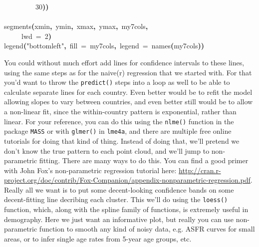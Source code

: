 \documentclass[a4paper]{article}
\newcommand{\hlnumber}[1]{\textcolor[rgb]{0.0823529411764706,0.0784313725490196,0.709803921568627}{#1}}%
\newcommand{\hlfunctioncall}[1]{\textcolor[rgb]{1,0,0}{#1}}%
\newcommand{\hlstring}[1]{\textcolor[rgb]{0.6,0.6,1}{#1}}%
\newcommand{\hlkeyword}[1]{\textcolor[rgb]{0,0,0}{\textbf{#1}}}%
\newcommand{\hlargument}[1]{\textcolor[rgb]{0.694117647058824,0.247058823529412,0.0196078431372549}{#1}}%
\newcommand{\hlsymbol}[1]{\textcolor[rgb]{0,0,0}{#1}}%
\newcommand{\hlprompt}[1]{\textcolor[rgb]{0,0,0}{#1}}%
\newcommand{\hlstd}[1]{\textcolor[rgb]{0,0,0}{#1}}%
\newenvironment{Houtput}{\raggedright}{%
%
}
\begin{document}
\begin{Houtput}
\hlstd{}\hlprompt{{\ }}{\ }{\ }{\ }{\ }{\ }{\ }{\ }{\ }\hlnumber{30}\hlkeyword{)}\hlkeyword{)}\hspace*{\fill}\\
\hlstd{}\hlprompt{{\ }}\hlkeyword{\usebox{\hlnormalsizeboxclosebrace}}\mbox{}
\normalfont
\hspace*{\fill}\\
\hlstd{}\ttfamily\noindent
\hlprompt{\usebox{\hlnormalsizeboxgreaterthan}{\ }}\hlfunctioncall{segments}\hlkeyword{(}\hlsymbol{xmin}\hlkeyword{,}{\ }\hlsymbol{ymin}\hlkeyword{,}{\ }\hlsymbol{xmax}\hlkeyword{,}{\ }\hlsymbol{ymax}\hlkeyword{,}{\ }\hlsymbol{my7cols}\hlkeyword{,}\hspace*{\fill}\\
\hlstd{}\hlprompt{{\ }}{\ }{\ }{\ }{\ }\hlargument{lwd}{\ }\hlargument{=}{\ }\hlnumber{2}\hlkeyword{)}\mbox{}
\normalfont
\hspace*{\fill}\\
\hlstd{}\ttfamily\noindent
\hlprompt{\usebox{\hlnormalsizeboxgreaterthan}{\ }}\hlfunctioncall{legend}\hlkeyword{(}\hlstring{"bottomleft"}\hlkeyword{,}{\ }\hlargument{fill}{\ }\hlargument{=}{\ }\hlsymbol{my7cols}\hlkeyword{,}{\ }\hlargument{legend}{\ }\hlargument{=}{\ }\hlfunctioncall{names}\hlkeyword{(}\hlsymbol{my7cols}\hlkeyword{)}\hlkeyword{)}\mbox{}
\normalfont
\hspace*{\fill}\\
\hlstd{}
\end{Houtput}
{\tikzexternaldisable

}

You could without much effort add lines for confidence intervals to these lines, using the same steps as for the naive(r) regression that we started with. For that you'd want to throw the \texttt{predict()} steps into a loop as well to be able to calculate separate lines for each country. Even better would be to refit the model allowing slopes to vary between countries, and even better still would be to allow a non-linear fit, since the within-country pattern is exponential, rather than linear. For your reference, you can do this using the \texttt{nlme()} function in the package \texttt{MASS} or with \texttt{glmer()} in \texttt{lme4a}, and there are multiple free online tutorials for doing that kind of thing. Instead of doing that, we'll pretend we don't know the true pattern to each point cloud, and we'll jump to non-parametric fitting. There are many ways to do this. You can find a good primer with John Fox's non-parametric regression tutorial here: \url{http://cran.r-project.org/doc/contrib/Fox-Companion/appendix-nonparametric-regression.pdf}. Really all we want is to put some decent-looking confidence bands on some decent-fitting line decribing each cluster. This we'll do using the \texttt{loess()} function, which, along with the spline family of functions, is extremely useful in demography. Here we just want an informative plot, but really you can use non-parametric function to smooth any kind of noisy data,  e.g. ASFR curves for small areas, or to infer single age rates from 5-year age groups, etc.\\
\end{document}
